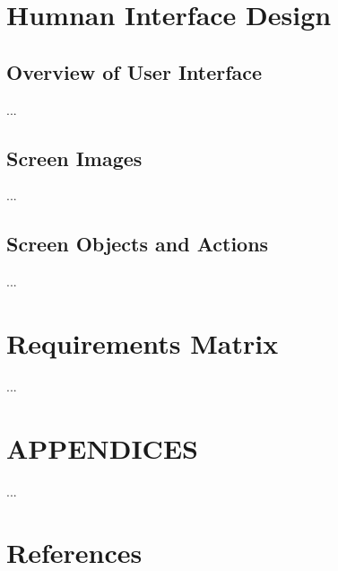 \documentclass[]{article}
\begin{document}
\section{Humnan Interface Design}

\subsection {Overview of User Interface}
...

\subsection {Screen Images}
...


\subsection {Screen Objects and Actions}
...


\section{Requirements Matrix}
...


\section{APPENDICES}
...

\section {References}



\end{document}
